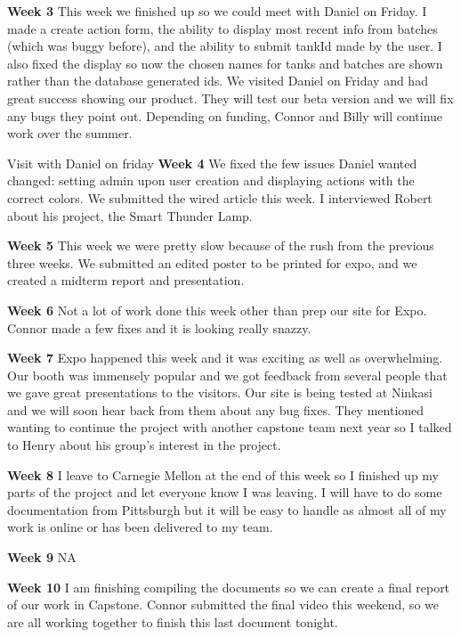 \noindent\medskip\textbf{Week 3}
This week we finished up so we could meet with Daniel on Friday.
I made a create action form, the ability to display most recent info from batches (which was buggy before), and the ability to submit tankId made by the user.
I also fixed the display so now the chosen names for tanks and batches are shown rather than the database generated ids.
We visited Daniel on Friday and had great success showing our product.
They will test our beta version and we will fix any bugs they point out.
Depending on funding, Connor and Billy will continue work over the summer.


Visit with Daniel on friday
\noindent\medskip\textbf{Week 4}
We fixed the few issues Daniel wanted changed: setting admin upon user creation and displaying actions with the correct colors.
We submitted the wired article this week. I interviewed Robert about his project, the Smart Thunder Lamp.


\noindent\medskip\textbf{Week 5}
This week we were pretty slow because of the rush from the previous three weeks.
We submitted an edited poster to be printed for expo, and we created a midterm report and presentation.

\noindent\medskip\textbf{Week 6}
Not a lot of work done this week other than prep our site for Expo.
Connor made a few fixes and it is looking really snazzy.

\noindent\medskip\textbf{Week 7}
Expo happened this week and it was exciting as well as overwhelming.
Our booth was immensely popular and we got feedback from several people that we gave great presentations to the visitors.
Our site is being tested at Ninkasi and we will soon hear back from them about any bug fixes.
They mentioned wanting to continue the project with another capstone team next year so I talked to Henry about his group's interest in the project.

\noindent\medskip\textbf{Week 8}
I leave to Carnegie Mellon at the end of this week so I finished up my parts of the project and let everyone know I was leaving.
I will have to do some documentation from Pittsburgh but it will be easy to handle as almost all of my work is online or has been delivered to my team.

\noindent\medskip\textbf{Week 9}
NA

\noindent\medskip\textbf{Week 10}
I am finishing compiling the documents so we can create a final report of our work in Capstone.
Connor submitted the final video this weekend, so we are all working together to finish this last document tonight.
